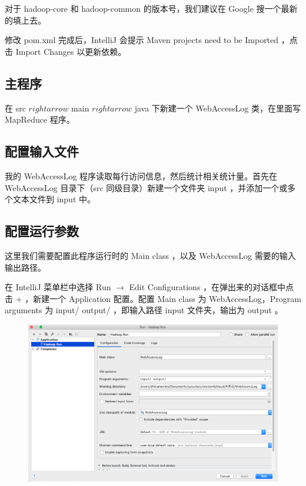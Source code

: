 \documentclass{article}
\begin{document}
对于 hadoop-core 和 hadoop-common 的版本号，我们建议在 Google 搜一个最新的填上去。

修改 pom.xml 完成后，IntelliJ 会提示 Maven projects need to be Imported ，点击 Import Changes 以更新依赖。

\subsection{主程序}

在 src $rightarrow$ main $rightarrow$ java 下新建一个 WebAccessLog 类，在里面写 MapReduce 程序。

\subsection{配置输入文件}

我的 WebAccessLog 程序读取每行访问信息，然后统计相关统计量。首先在 WebAccessLog 目录下（src 同级目录）新建一个文件夹 input ，并添加一个或多个文本文件到 input 中。

\subsection{配置运行参数}

这里我们需要配置此程序运行时的 Main class ，以及 WebAccessLog 需要的输入输出路径。

在 IntelliJ 菜单栏中选择 Run $\rightarrow$ Edit Configurations ，在弹出来的对话框中点击 $+$ ，新建一个 Application 配置。配置 Main class 为 WebAccessLog，Program arguments 为 input/ output/ ，即输入路径 input 文件夹，输出为 output 。

\begin{figure}[!ht]
\centering
\includegraphics[scale=0.4]{image/7.png}
\end{figure}
\end{document}
